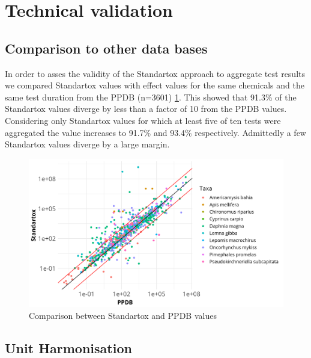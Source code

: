 
\section{Technical validation}

\subsection{Comparison to other data bases}

In order to asses the validity of the Standartox approach to aggregate test results we compared Standartox values with effect values for the same chemicals and the same test duration from the PPDB (n=3601) \ref{fig:standartox_ppdb_diff}. This showed that 91.3\% of the Standartox values diverge by less than a factor of 10 from the PPDB values. Considering only Standartox values for which at least five of ten tests were aggregated the value increases to 91.7\% and 93.4\% respectively. Admittedly a few Standartox values diverge by a large margin.

\begin{figure}
    \includegraphics[width=1\linewidth]{article/figures/gg_ppdb_stan_compare_continous.png}
    \caption{Comparison between Standartox and PPDB values}
    \label{fig:standartox_ppdb_diff}
\end{figure}

\subsection{Unit Harmonisation}

